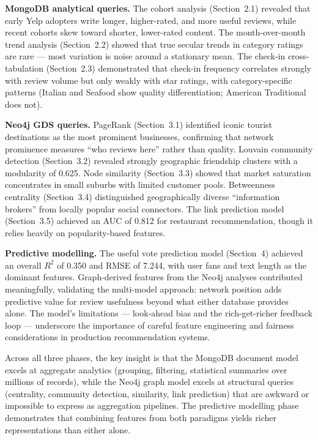 \documentclass[11pt]{article}
\begin{document}
\textbf{MongoDB analytical queries.} The cohort analysis (Section~2.1) revealed that early Yelp adopters write longer, higher-rated, and more useful reviews, while recent cohorts skew toward shorter, lower-rated content. The month-over-month trend analysis (Section~2.2) showed that true secular trends in category ratings are rare --- most variation is noise around a stationary mean. The check-in cross-tabulation (Section~2.3) demonstrated that check-in frequency correlates strongly with review volume but only weakly with star ratings, with category-specific patterns (Italian and Seafood show quality differentiation; American Traditional does not).

\textbf{Neo4j GDS queries.} PageRank (Section~3.1) identified iconic tourist destinations as the most prominent businesses, confirming that network prominence measures ``who reviews here'' rather than quality. Louvain community detection (Section~3.2) revealed strongly geographic friendship clusters with a modularity of 0.625. Node similarity (Section~3.3) showed that market saturation concentrates in small suburbs with limited customer pools. Betweenness centrality (Section~3.4) distinguished geographically diverse ``information brokers'' from locally popular social connectors. The link prediction model (Section~3.5) achieved an AUC of 0.812 for restaurant recommendation, though it relies heavily on popularity-based features.

\textbf{Predictive modelling.} The useful vote prediction model (Section~4) achieved an overall $R^2$ of 0.350 and RMSE of 7.244, with user fans and text length as the dominant features. Graph-derived features from the Neo4j analyses contributed meaningfully, validating the multi-model approach: network position adds predictive value for review usefulness beyond what either database provides alone. The model's limitations --- look-ahead bias and the rich-get-richer feedback loop --- underscore the importance of careful feature engineering and fairness considerations in production recommendation systems.

Across all three phases, the key insight is that the MongoDB document model excels at aggregate analytics (grouping, filtering, statistical summaries over millions of records), while the Neo4j graph model excels at structural queries (centrality, community detection, similarity, link prediction) that are awkward or impossible to express as aggregation pipelines. The predictive modelling phase demonstrates that combining features from both paradigms yields richer representations than either alone.
\end{document}
